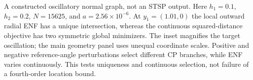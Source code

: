 \caption{A constructed oscillatory normal graph, not an STSP output. Here $h_1=0.1$, $h_2=0.2$, $N=15625$, and $a=2.56\times10^{-6}$. At $y_1=(1.01,0)$ the local outward radial ENF has a unique intersection, whereas the continuous squared-distance objective has two symmetric global minimizers. The inset magnifies the target oscillation; the main geometry panel uses unequal coordinate scales. Positive and negative reference-angle perturbations select different CP branches, while ENF varies continuously. This tests uniqueness and continuous selection, not failure of a fourth-order location bound.}
